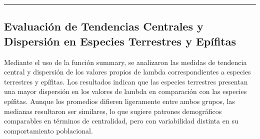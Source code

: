 \documentclass[
  12pt,
  letterpaper,
]{book}
\newenvironment{Shaded}{\begin{snugshade}}{\end{snugshade}}
\newcommand{\AttributeTok}[1]{\textcolor[rgb]{0.40,0.45,0.13}{#1}}
\newcommand{\CommentTok}[1]{\textcolor[rgb]{0.37,0.37,0.37}{#1}}
\newcommand{\FunctionTok}[1]{\textcolor[rgb]{0.28,0.35,0.67}{#1}}
\newcommand{\NormalTok}[1]{\textcolor[rgb]{0.00,0.23,0.31}{#1}}
\newcommand{\OtherTok}[1]{\textcolor[rgb]{0.00,0.23,0.31}{#1}}
\newcommand{\SpecialCharTok}[1]{\textcolor[rgb]{0.37,0.37,0.37}{#1}}
\newcommand{\StringTok}[1]{\textcolor[rgb]{0.13,0.47,0.30}{#1}}
\begin{document}
\begin{center}\rule{0.5\linewidth}{0.5pt}\end{center}

\subsection{Evaluación de Tendencias Centrales y Dispersión en Especies
Terrestres y
Epífitas}\label{evaluaciuxf3n-de-tendencias-centrales-y-dispersiuxf3n-en-especies-terrestres-y-epuxedfitas}

Mediante el uso de la función summary, se analizaron las medidas de
tendencia central y dispersión de los valores propios de lambda
correspondientes a especies terrestres y epífitas. Los resultados
indican que las especies terrestres presentan una mayor dispersión en
los valores de lambda en comparación con las especies epífitas. Aunque
los promedios difieren ligeramente entre ambos grupos, las medianas
resultaron ser similares, lo que sugiere patrones demográficos
comparables en términos de centralidad, pero con variabilidad distinta
en su comportamiento poblacional.

\begin{Shaded}
\end{Shaded}
\end{document}
